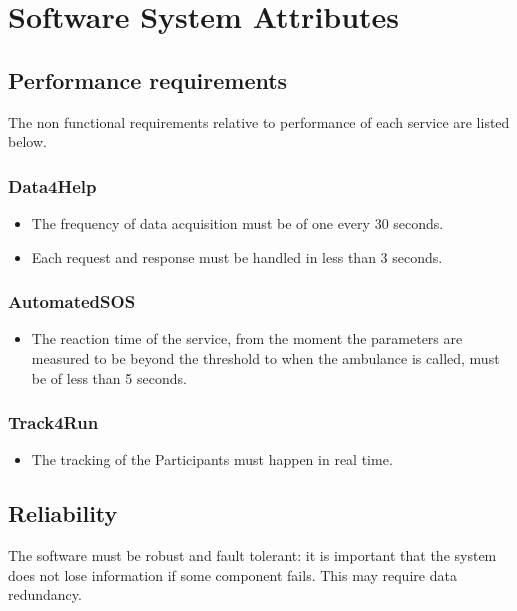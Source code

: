 \section{Software System Attributes}
    \subsection{Performance requirements}
        The non functional requirements relative to performance of each service are listed below.
        \subsubsection{Data4Help}
            \begin{itemize}
                \item The frequency of data acquisition must be of one every 30 seconds.
                \item Each request and response must be handled in less than 3 seconds.
            \end{itemize}
            
        \subsubsection{AutomatedSOS}
            \begin{itemize}
                \item The reaction time of the service, from the moment the parameters are measured to be beyond the threshold to when the ambulance is called, must be of less than 5 seconds.
            \end{itemize}
            
        \subsubsection{Track4Run}
            \begin{itemize}
                \item The tracking of the Participants must happen in real time.
            \end{itemize}
            
    \subsection{Reliability}
        The software must be robust and fault tolerant: it is important that the system does not lose information if some component fails. This may require data redundancy.
        
